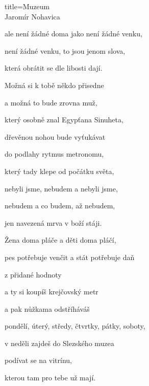 \begin{song}{title=\predtitle\centering Muzeum \\\large Jaromír Nohavica  \vspace*{-0.3cm}}
\begin{centerjustified}
\begin{varwidth}[t]{0.48\textwidth}
	ale není žádné doma jako není žádné venku,
	
	není žádné venku, to jsou jenom slova,
	
	která obrátit se dle libosti dají.


\end{varwidth}\mezisloupci\begin{varwidth}[t]{0.53\textwidth}\setlength{\parindent}{\pindent}
\normalni

\sloka
	Možná si k tobě někdo přisedne
	
	a možná to bude zrovna muž,
	
	který osobně znal Egypťana Sinuheta,
	
	dřevěnou nohou bude vyťukávat
	
	do podlahy rytmus metronomu,
	
	který tady klepe od počátku světa,
	
	nebyli jsme, nebudem a nebyli jsme,
	
	nebudem a co budem, až nebudem,
	
	jen navezená mrva v boží stáji.
	
	

\sloka
	Žena doma pláče a děti doma pláčí,

	pes potřebuje venčit a stát potřebuje daň
	
	z přidané hodnoty

	a ty si koupíš krejčovský metr
	
	a pak nůžkama odstříháváš

	pondělí, úterý, středy, čtvrtky, pátky, soboty,

	v neděli zajdeš do Slezského muzea
	
	podívat se na vitrínu,

	kterou tam pro tebe už mají.


\end{varwidth}

\end{centerjustified}
\setcounter{Slokočet}{0}
\end{song}
